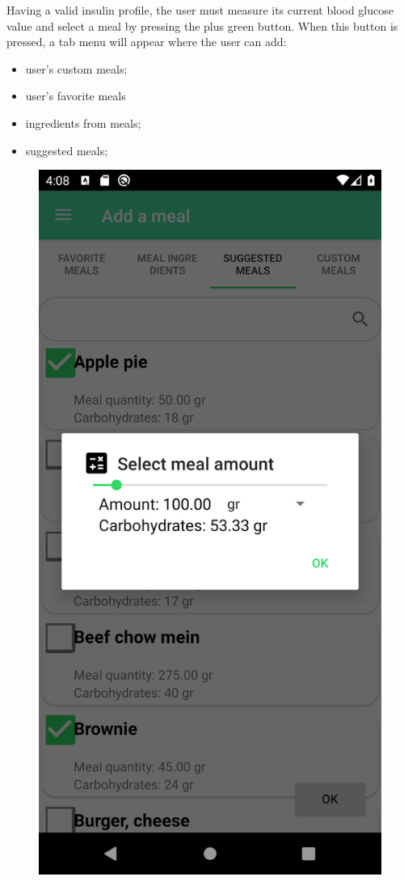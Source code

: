 Having a valid insulin profile, the user must measure its current blood glucose value and select a meal by pressing the plus green button.
When this button is pressed, a tab menu will appear where the user can add:
\begin{itemize}
    \item user's custom meals;
    \item user's favorite meals
    \item ingredients from meals;
    \item suggested meals; 
\end{itemize}

\begin{figure}[H]
    \begin{center}
        \includegraphics[scale=0.1]{_figures/calc_meal_selection.png}

\end{center}
\end{figure}
